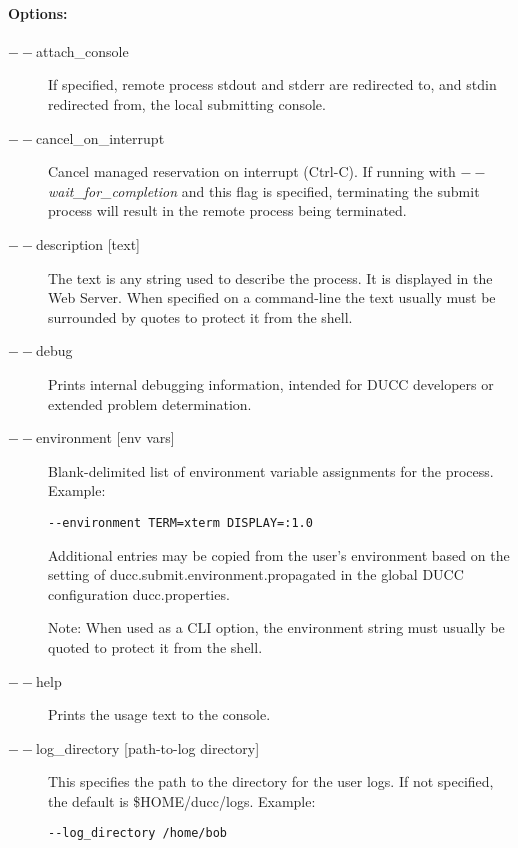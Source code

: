     \paragraph{Options:}
    \begin{description}
    
        \item[$--$attach\_console] If specified, remote process stdout and stderr are 
          redirected to, and stdin redirected from, the local submitting console.
          
        \item[$--$cancel\_on\_interrupt ] Cancel managed reservation on interrupt
          (Ctrl-C).  If running with {\em $--$wait\_for\_completion} and this flag is specified,
          terminating the submit process will result in the remote process being terminated.

        \item[$--$description {[text]}] The text is any string used to describe the process. It is
          displayed in the Web Server. When specified on a command-line the text usually must be
          surrounded by quotes to protect it from the shell.

        \item[$--$debug ] Prints internal debugging information, intended for DUCC developers or
          extended problem determination.

        \item[$--$environment {[env vars]}] Blank-delimited list of environment variable
          assignments for the process. Example:
          \begin{verbatim}
--environment TERM=xterm DISPLAY=:1.0
          \end{verbatim}
             
          Additional entries may be copied from the user's environment based on the setting of
          ducc.submit.environment.propagated in the global DUCC configuration ducc.properties.

          Note: When used as a CLI option, the environment string must usually be
          quoted to protect it from the shell.

        \item[$--$help] Prints the usage text to the console.

        \item[$--$log\_directory {[path-to-log directory]} ]

          This specifies the path to the directory for the user logs. If not specified, the default
          is \$HOME/ducc/logs. Example: 
\begin{verbatim}
--log_directory /home/bob 
\end{verbatim}
          

\end{description}

